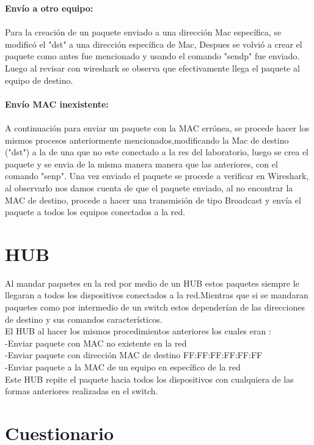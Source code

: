 \documentclass{udpreport}
\begin{document}
		{\bf \large Envío a otro equipo:}\\\\
		Para la creación de un paquete enviado a una dirección Mac específica, se modificó el "dst" a una dirección específica de
		Mac, Despues se volvió a crear el paquete como antes fue mencionado y usando el comando "sendp" fue enviado. Luego al revisar con wireshark se observa que
		efectivamente llega el paquete al equipo de destino.\\\\
		
		{\bf \large Envío MAC inexistente:}\\\\
		A continuación para enviar un paquete con la MAC errónea, se procede hacer los mismos procesos anteriormente
		mencionados,modificando la Mac de destino ("dst") a la de una que no este conectado a la res del laboratorio, luego se crea el paquete y se envia de la misma manera manera que las anteriores, con el comando "senp".
		Una vez enviado el paquete se procede a verificar en Wireshark, al observarlo nos damos cuenta de que el paquete enviado, al no encontrar la MAC de destino, procede a hacer una
		transmisión de tipo Broadcast y envía el paquete a todos los equipos conectados a la red.
		
		
		
	\section{HUB}
	 	Al mandar paquetes en la red por medio de un HUB estos paquetes siempre 
 		le llegaran a todos los dispositivos conectados a la red.Mientras que si
 		se mandaran paquetes como por intermedio de un switch estos dependerían de 
 		las direcciones de destino  y sus comandos característicos.\\
 		El HUB al hacer  los mismos procedimientos anteriores los cuales eran :\\
 		-Enviar paquete con MAC no existente en la red\\
 		-Enviar paquete con dirección MAC de destino FF:FF:FF:FF:FF:FF\\
 		-Enviar paquete a la MAC de un equipo en específico de la red\\
 		Este HUB repite el paquete hacia todos los dispositivos con cualquiera
 		de las formas anteriores realizadas en el switch.
 		
	\section{Cuestionario}
	
\end{document}
